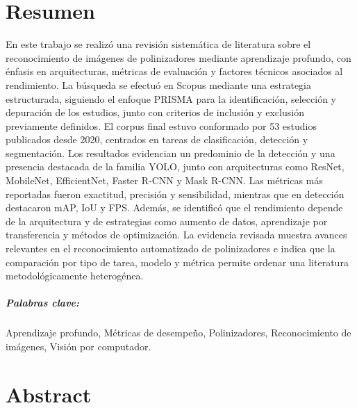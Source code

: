 \chapter{Resumen}

En este trabajo se realizó una revisión sistemática de literatura sobre el reconocimiento de imágenes de polinizadores mediante aprendizaje profundo, con énfasis en arquitecturas, métricas de evaluación y factores técnicos asociados al rendimiento. La búsqueda se efectuó en Scopus mediante una estrategia estructurada, siguiendo el enfoque PRISMA para la identificación, selección y depuración de los estudios, junto con criterios de inclusión y exclusión previamente definidos. El corpus final estuvo conformado por 53 estudios publicados desde 2020, centrados en tareas de clasificación, detección y segmentación. Los resultados evidencian un predominio de la detección y una presencia destacada de la familia YOLO, junto con arquitecturas como ResNet, MobileNet, EfficientNet, Faster R-CNN y Mask R-CNN. Las métricas más reportadas fueron exactitud, precisión y sensibilidad, mientras que en detección destacaron mAP, IoU y FPS. Además, se identificó que el rendimiento depende de la arquitectura y de estrategias como aumento de datos, aprendizaje por transferencia y métodos de optimización. La evidencia revisada muestra avances relevantes en el reconocimiento automatizado de polinizadores e indica que la comparación por tipo de tarea, modelo y métrica permite ordenar una literatura metodológicamente heterogénea.


\paragraph{Palabras clave:} Aprendizaje profundo, Métricas de desempeño, Polinizadores, Reconocimiento de imágenes, Visión por computador.

\chapter{Abstract}

